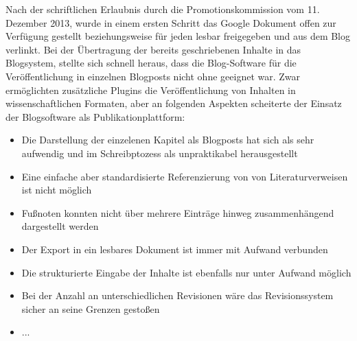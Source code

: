 Nach der schriftlichen Erlaubnis durch die Promotionskommission vom 11. Dezember 2013, wurde in einem ersten Schritt das Google Dokument offen zur Verfügung gestellt beziehungsweise für jeden lesbar freigegeben und aus dem Blog verlinkt. Bei der Übertragung der bereits geschriebenen Inhalte in das Blogsystem, stellte sich schnell heraus, dass die Blog-Software für die Veröffentlichung in einzelnen Blogposts nicht ohne geeignet war. Zwar ermöglichten zusätzliche Plugins die Veröffentlichung von Inhalten in wissenschaftlichen Formaten, aber an folgenden Aspekten scheiterte der Einsatz der Blogsoftware als Publikationplattform:
\begin{itemize}
\item Die Darstellung der einzelenen Kapitel als Blogposts hat sich als sehr aufwendig und im Schreibptozess als unpraktikabel herausgestellt
\item Eine einfache aber standardisierte Referenzierung von von Literaturverweisen ist nicht möglich
\item Fußnoten konnten nicht über mehrere Einträge hinweg zusammenhängend dargestellt werden
\item Der Export in ein lesbares Dokument ist immer mit Aufwand verbunden
\item Die strukturierte Eingabe der Inhalte ist ebenfalls nur unter Aufwand möglich
\item Bei der Anzahl an unterschiedlichen Revisionen wäre das Revisionssystem sicher an seine Grenzen gestoßen
\item ...
\end{itemize}

